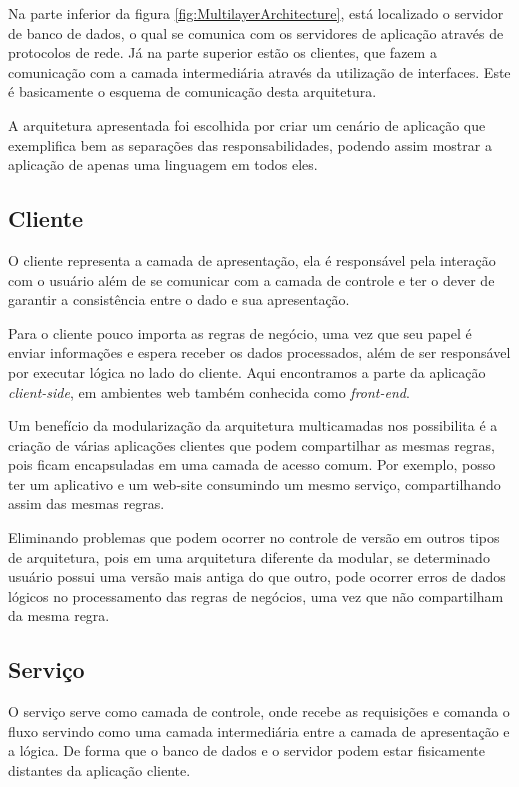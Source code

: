 \documentclass[
	12pt,				%
	openright,			%
	twoside,			%
	a4paper,			%
	english,			%
	brazil				%
	]{abntex2}
\begin{document}
Na parte inferior da figura \ref{fig:MultilayerArchitecture}, está localizado o servidor de banco de dados, o qual se comunica com os servidores de aplicação através de protocolos de rede. Já na parte superior estão os clientes, que fazem a comunicação com a camada intermediária através da utilização de interfaces. Este é basicamente o esquema de comunicação desta arquitetura.

A arquitetura apresentada foi escolhida por criar um cenário de aplicação que exemplifica bem as separações das responsabilidades, podendo assim mostrar a aplicação de apenas uma linguagem em todos eles.

\subsection{Cliente}
\label{subsec:Cliente}

O cliente representa a camada de apresentação, ela é responsável pela interação com o usuário além de se comunicar com a camada de controle e ter o dever de garantir a consistência entre o dado e sua apresentação.

Para o cliente pouco importa as regras de negócio, uma vez que seu papel é enviar informações e espera receber os dados processados, além de ser responsável por executar lógica no lado do cliente. Aqui encontramos a parte da aplicação \textit{client-side}, em ambientes web também conhecida como \textit{front-end}.

Um benefício da modularização da arquitetura multicamadas nos possibilita é a criação de várias aplicações clientes que podem compartilhar as mesmas regras, pois ficam encapsuladas em uma camada de acesso comum. Por exemplo, posso ter um aplicativo e um web-site consumindo um mesmo serviço, compartilhando assim das mesmas regras.

Eliminando problemas que podem ocorrer no controle de versão em outros tipos de arquitetura, pois em uma arquitetura diferente da modular, se determinado usuário possui uma versão mais antiga do que outro, pode ocorrer erros de dados lógicos no processamento das regras de negócios, uma vez que não compartilham da mesma regra.

\subsection{Serviço}
\label{subsec:Servico}

O serviço serve como camada de controle, onde recebe as requisições e comanda o fluxo servindo como uma camada intermediária entre a camada de apresentação e a lógica. De forma que o banco de dados e o servidor podem estar fisicamente distantes da aplicação cliente.
\end{document}
